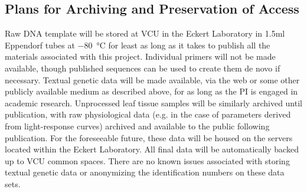 \subsection*{Plans for Archiving and Preservation of Access}
Raw DNA template will be stored at VCU in the Eckert Laboratory in 1.5ml Eppendorf tubes at \SI{-80}{\celsius} for least as 
long as it takes to publish all the materials associated with this project. Individual primers will not be made available, 
though published sequences can be used to create them de novo if necessary. Textual genetic data will be made 
available, via the web or some other publicly available medium as described above, for as long as the PI is 
engaged in academic research. Unprocessed leaf tissue samples will be similarly archived until publication, with 
raw physiological data (e.g. in the case of parameters derived from light-response curves) archived and available 
to the public following publication. For the foreseeable future, these data will be housed on the servers located within 
the Eckert Laboratory. All final data will be automatically backed up to VCU common spaces. There are no known 
issues associated with storing textual genetic data or anonymizing the identification numbers on these data sets.





















